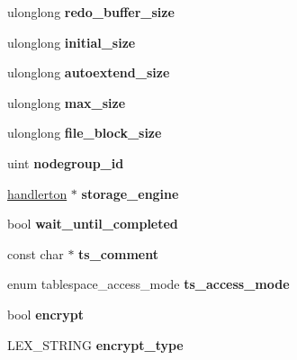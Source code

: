 \begin{DoxyCompactItemize}
\mbox{\label{classst__alter__tablespace_ac4a6bbc5d4e600ce8d334d6ce219203c}} 
ulonglong {\bfseries redo\+\_\+buffer\+\_\+size}
\item 
\mbox{\label{classst__alter__tablespace_adb2c33e79dea895ec822dca1aff3cd1d}} 
ulonglong {\bfseries initial\+\_\+size}
\item 
\mbox{\label{classst__alter__tablespace_a1ee321bfce2bbecaa379e2a37a38b31f}} 
ulonglong {\bfseries autoextend\+\_\+size}
\item 
\mbox{\label{classst__alter__tablespace_ad7bec675900b0b339c94121438621915}} 
ulonglong {\bfseries max\+\_\+size}
\item 
\mbox{\label{classst__alter__tablespace_a7283067ca475ad727a36a8fa1f8d5d32}} 
ulonglong {\bfseries file\+\_\+block\+\_\+size}
\item 
\mbox{\label{classst__alter__tablespace_ae674675a4fdb2f29ab74d2636cd65a72}} 
uint {\bfseries nodegroup\+\_\+id}
\item 
\mbox{\label{classst__alter__tablespace_a91ac4db262c29ce1e4370d7db2fab7c5}} 
\mbox{\hyperlink{structhandlerton}{handlerton}} $\ast$ {\bfseries storage\+\_\+engine}
\item 
\mbox{\label{classst__alter__tablespace_a2165929de166b505b69d79a3f61811ec}} 
bool {\bfseries wait\+\_\+until\+\_\+completed}
\item 
\mbox{\label{classst__alter__tablespace_a867530167d8524b4cf9f0a8ff3fe3782}} 
const char $\ast$ {\bfseries ts\+\_\+comment}
\item 
\mbox{\label{classst__alter__tablespace_a132f2d8adc804d46e6934750e670a886}} 
enum tablespace\+\_\+access\+\_\+mode {\bfseries ts\+\_\+access\+\_\+mode}
\item 
\mbox{\label{classst__alter__tablespace_a2f330f86f7c714231c84538dc4c3e753}} 
bool {\bfseries encrypt}
\item 
\mbox{\label{classst__alter__tablespace_a22f97b50f0b230eec58f648003178aa3}} 
L\+E\+X\+\_\+\+S\+T\+R\+I\+NG {\bfseries encrypt\+\_\+type}
\end{DoxyCompactItemize}
